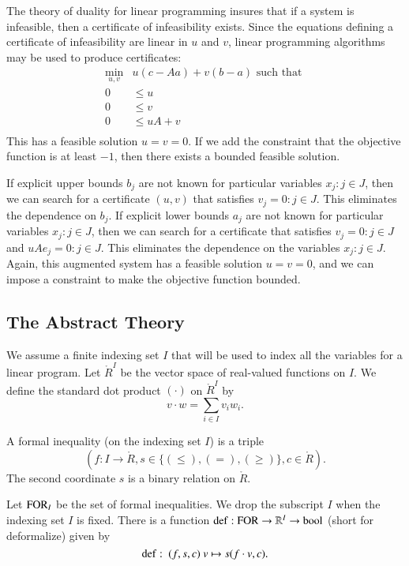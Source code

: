 The theory of duality for linear programming insures that if a
system is infeasible, then a certificate of infeasibility exists.
Since the equations defining a certificate of infeasibility are
linear in $u$ and $v$, linear programming algorithms may be used
to produce certificates:
    $$
    \begin{array}{rll}
        \min_{u,v} &u (c-A a) + v(b-a) \text{ such that }\\
        0 &\le u\\
        0 &\le v \\
        0& \le u A + v\\
    \end{array}
    $$
This has a feasible solution $u=v=0$.  If we add the constraint
that the objective function is at least $-1$, then there exists a
bounded feasible solution.

\begin{remark}
\label{rem:bounded}
If explicit upper bounds $b_j$  are not known
for particular variables $x_j:j\in J$, then we can search for a
certificate $(u,v)$ that satisfies $v_j = 0:j\in J$.  This
eliminates the dependence on $b_j$.  If explicit lower bounds
$a_j$ are not known for particular variables $x_j:j\in J$, then we
can search for a certificate that satisfies $v_j = 0:j\in J$ and
$u A e_j = 0: j\in J$. This eliminates the dependence on the
variables $x_j:j\in J$. Again, this augmented system has a
feasible solution $u=v=0$, and we can impose a constraint to make
the objective function bounded.
\end{remark}

\subsection{The Abstract Theory}

We assume a finite indexing set $I$ that will be used  to index
all the variables for a linear program. Let $\ring{R}^I$ be the
vector space of real-valued functions on $I$. We define the
standard dot product $(\cdot)$ on $\ring{R}^I$ by
    $$v\cdot w = \sum_{i\in I} v_i w_i.$$

\begin{definition}
A formal inequality (on the indexing set $I$) is a triple
    $$(f:I\to\ring{R},s\in\{(\le),(=),(\ge)\},c\in\ring{R}).$$
The second coordinate $s$ is a binary relation on $\ring{R}$.
\end{definition}

Let ${\operatorname{FOR}}_I$ be the set of formal inequalities.  We drop the
subscript $I$ when the indexing set $I$ is fixed.  There is a
function ${\operatorname{def}}:{\operatorname{FOR}}\to \mathbb{R}^I \to \operatorname{bool}$ (short for
deformalize) given by
    $$\op{def}:\ (f,s,c)\ v \mapsto s(f\cdot v,c).$$

